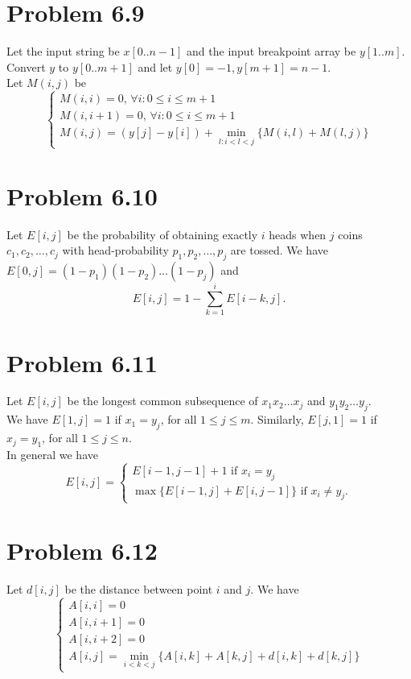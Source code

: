 \documentclass[12pt]{article}
\begin{document}
\section{Problem 6.9}
Let the input string be $x[0..n-1]$ and the input breakpoint array be $y[1..m]$. Convert $y$ to $y[0..m+1]$ and let $y[0] = -1, y[m+1] = n-1$. \\
Let $M(i,j)$ be 
$$\begin{cases} M(i,i)=0\text{, }\forall i: 0 \le i \le m + 1 \\
M(i,i + 1)=0\text{, }\forall i: 0 \le i \le m + 1\\
M(i,j)=\left(y[j]-y[i]\right) + \displaystyle \min_{l: i < l < j}\{M(i,l) + M(l,j)\}
\end{cases}$$

\section{Problem 6.10}
Let $E[i,j]$ be the probability of obtaining exactly $i$ heads when $j$ coins $c_1, c_2, \ldots, c_j$ with head-probability $p_1, p_2, \ldots, p_j$ are tossed.
We have $E[0,j] = (1-p_1)(1-p_2) \ldots (1-p_j)$ and $$E[i,j] = 1 - \sum_{k=1}^i E[i-k,j].$$

\section{Problem 6.11}
Let $E[i,j]$ be the longest common subsequence of $x_1 x_2 \ldots x_j$ and $y_1 y_2 \ldots y_j$. \\
We have $E[1,j] = 1$ if $x_1 = y_j$, for all $1 \le j \le m$. Similarly, $E[j,1] = 1$ if $x_j = y_1$, for all $1 \le j \le n$. \\
In general we have $$E[i,j] = \begin{cases} E[i-1,j-1] + 1 \text{ if } x_i = y_j \\ \max \{E[i-1,j] + E[i,j-1] \} \text{ if } x_i \ne y_j. \end{cases}$$

\section{Problem 6.12}
Let $d[i,j]$ be the distance between point $i$ and $j$. We have $$\begin{cases} A[i,i] = 0 \\ A[i, i + 1] = 0 \\ A[i, i+2] = 0 \\ A[i,j] = \displaystyle \min_{i < k < j} \{ A[i,k] + A[k,j] + d[i,k] + d[k,j]\} \end{cases}$$
\end{document}
